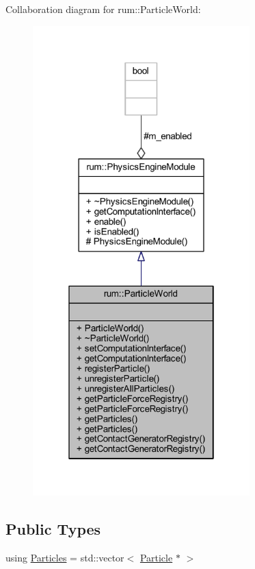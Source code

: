 Collaboration diagram for rum\+:\+:Particle\+World\+:\nopagebreak
\begin{figure}[H]
\begin{center}
\leavevmode
\includegraphics[width=238pt]{classrum_1_1_particle_world__coll__graph}
\end{center}
\end{figure}
\subsection*{Public Types}
\begin{DoxyCompactItemize}
\item 
using \mbox{\hyperlink{classrum_1_1_particle_world_ac172daef7c571097de59488881afa300}{Particles}} = std\+::vector$<$ \mbox{\hyperlink{classrum_1_1_particle}{Particle}} $\ast$ $>$
\end{DoxyCompactItemize}
